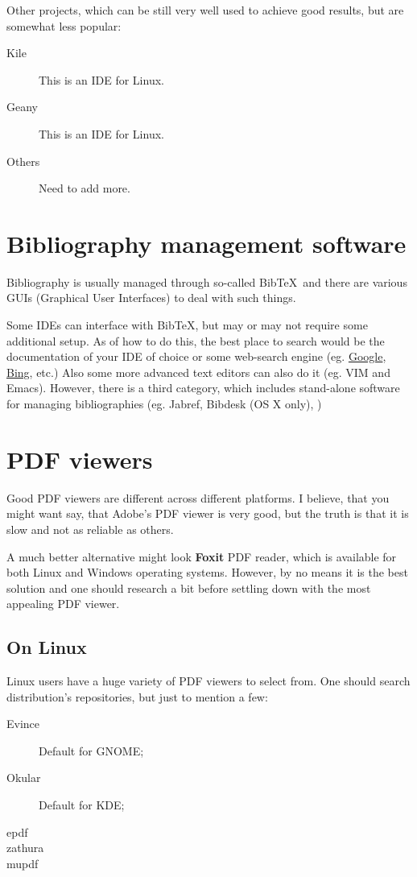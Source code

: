 \documentclass[a4paper]{article}
\begin{document}
Other projects, which can be still very well used to achieve good results, but
are somewhat less popular:
\begin{description}
    \item[Kile] This is an IDE for Linux.
    \item[Geany] This is an IDE for Linux.
    \item[Others] Need to add more.
\end{description}

\section{Bibliography management software}

Bibliography is usually managed through so-called Bib\TeX\ and there are various
GUIs (Graphical User Interfaces) to deal with such things. 

Some IDEs can interface with Bib\TeX, but may or may not require some additional
setup. As of how to do this, the best place to search would be the documentation
of your IDE of choice or some web-search engine (eg.
\href{http://www.google.co.uk}{Google}, \href{http://www.bing.co.uk}{Bing},
etc.)
Also some more advanced text editors can also do it (eg. VIM and Emacs).
However, there is a third category, which includes stand-alone software for
managing bibliographies (eg. Jabref, Bibdesk (OS X only), )

\section{PDF viewers}

Good PDF viewers are different across different platforms. I believe, that you
might want say, that Adobe's PDF viewer is very good, but the truth is that it
is slow and not as reliable as others.

A much better alternative might look \textbf{Foxit} PDF reader, which is
available for both Linux and Windows operating systems. However, by no means it
is the best solution and one should research a bit before settling down with the
most appealing PDF viewer.

\subsection{On Linux}

Linux users have a huge variety of PDF viewers to select from. One should search
distribution's repositories, but just to mention a few:
\begin{description}
    \item[Evince] Default for GNOME;
    \item[Okular] Default for KDE;
    \item[epdf]
    \item[zathura]
    \item[mupdf]
\end{description}
\end{document}
